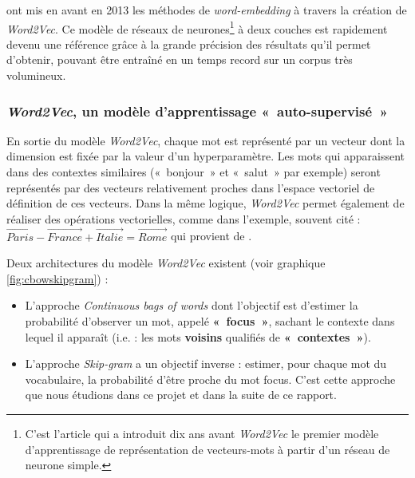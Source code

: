 \documentclass[11pt,french,french]{article}
\let\rmarkdownfootnote\footnote%
\def\footnote{\protect\rmarkdownfootnote}
\begin{document}
\cite{Mikolov} ont mis en avant en 2013 les méthodes de
\emph{word-embedding} à travers la création de \emph{Word2Vec}. Ce
modèle de réseaux de neurones\footnote{C'est l'article \cite{Bengio} qui
  a introduit dix ans avant \emph{Word2Vec} le premier modèle
  d'apprentissage de représentation de vecteurs-mots à partir d'un
  réseau de neurone simple.} à deux couches est rapidement devenu une
référence grâce à la grande précision des résultats qu'il permet
d'obtenir, pouvant être entraîné en un temps record sur un corpus très
volumineux.

\subsubsection{\texorpdfstring{\emph{Word2Vec}, un modèle
d'apprentissage
«~auto-supervisé~»}{Word2Vec, un modèle d'apprentissage «~auto-supervisé~»}}\label{subsec:word2vec}

En sortie du modèle \emph{Word2Vec}, chaque mot est représenté par un
vecteur dont la dimension est fixée par la valeur d'un hyperparamètre.
Les mots qui apparaissent dans des contextes similaires («~bonjour~» et
«~salut~» par exemple) seront représentés par des vecteurs relativement
proches dans l'espace vectoriel de définition de ces vecteurs. Dans la
même logique, \emph{Word2Vec} permet également de réaliser des
opérations vectorielles, comme dans l'exemple, souvent cité :
\(\overrightarrow{Paris} - \overrightarrow{France} + \overrightarrow{Italie} = \overrightarrow{Rome}\)
qui provient de \cite{Mikolov}.

Deux architectures du modèle \emph{Word2Vec} existent (voir graphique
\ref{fig:cbowskipgram}) :

\begin{itemize}
\item
  L'approche \emph{Continuous bags of words} dont l'objectif est
  d'estimer la probabilité d'observer un mot, appelé \textbf{«~focus~»},
  sachant le contexte dans lequel il apparaît (i.e. : les mots
  \textbf{voisins} qualifiés de \textbf{«~contextes~»}).
\item
  L'approche \emph{Skip-gram} a un objectif inverse : estimer, pour
  chaque mot du vocabulaire, la probabilité d'être proche du mot focus.
  C'est cette approche que nous étudions dans ce projet et dans la suite
  de ce rapport. 
\end{itemize}
\end{document}
